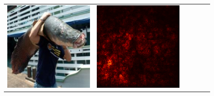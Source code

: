 \documentclass[preprint,12pt]{elsarticle}
\begin{document}
\begin{figure}[p]
\begin{tabular}{cccccc}
  \includegraphics[scale=\scale]{../visualizations/examples/imagenette/resnet18/images/4.png} &
  \includegraphics[scale=\scale]{../visualizations/examples/imagenette/resnet18/saliency_map/4.png} & 

\end{tabular}
\end{figure}
\end{document}
